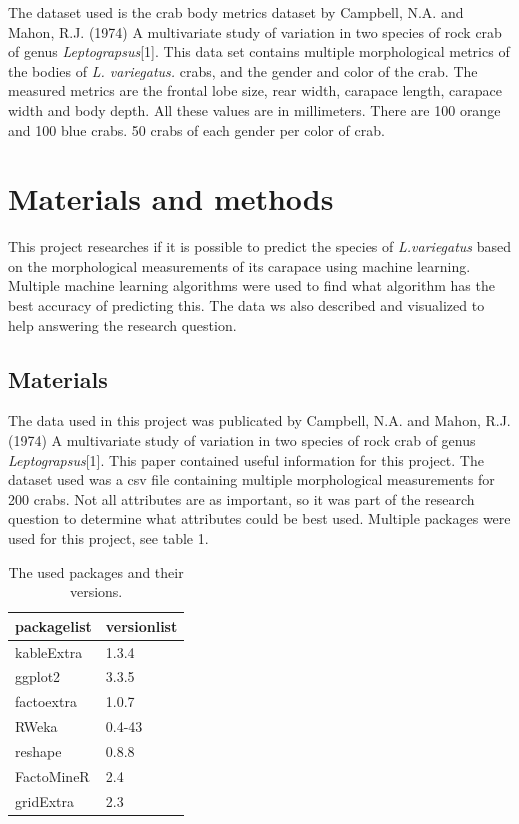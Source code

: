 \documentclass[
]{article}
\begin{document}
The dataset used is the crab body metrics dataset by Campbell, N.A. and
Mahon, R.J. (1974) A multivariate study of variation in two species of
rock crab of genus \emph{Leptograpsus}{[}1{]}. This data set contains
multiple morphological metrics of the bodies of \emph{L. variegatus.}
crabs, and the gender and color of the crab. The measured metrics are
the frontal lobe size, rear width, carapace length, carapace width and
body depth. All these values are in millimeters. There are 100 orange
and 100 blue crabs. 50 crabs of each gender per color of crab.

\newpage

\hypertarget{materials-and-methods}{%
\section{Materials and methods}\label{materials-and-methods}}

This project researches if it is possible to predict the species of
\emph{L.variegatus} based on the morphological measurements of its
carapace using machine learning. Multiple machine learning algorithms
were used to find what algorithm has the best accuracy of predicting
this. The data ws also described and visualized to help answering the
research question.

\hypertarget{materials}{%
\subsection{Materials}\label{materials}}

The data used in this project was publicated by Campbell, N.A. and
Mahon, R.J. (1974) A multivariate study of variation in two species of
rock crab of genus \emph{Leptograpsus}{[}1{]}. This paper contained
useful information for this project. The dataset used was a csv file
containing multiple morphological measurements for 200 crabs. Not all
attributes are as important, so it was part of the research question to
determine what attributes could be best used. Multiple packages were
used for this project, see table 1.

\begin{table}[!h]

\caption{\label{tab:packages}The used packages and their versions.}
\centering
\begin{tabular}[t]{l|l}
\hline
packagelist & versionlist\\
\hline
kableExtra & 1.3.4\\
\hline
ggplot2 & 3.3.5\\
\hline
factoextra & 1.0.7\\
\hline
RWeka & 0.4-43\\
\hline
reshape & 0.8.8\\
\hline
FactoMineR & 2.4\\
\hline
gridExtra & 2.3\\
\hline
\end{tabular}
\end{table}
\end{document}
